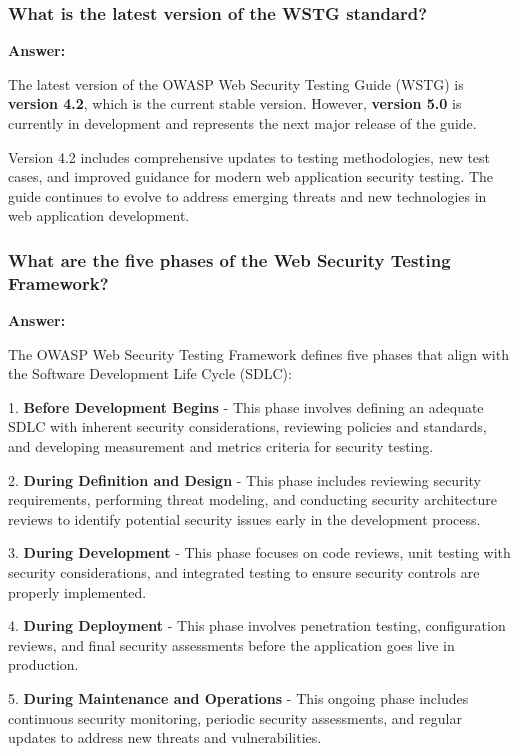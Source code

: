 \documentclass[12pt,a4paper]{article}
\begin{document}
\subsubsection{What is the latest version of the WSTG standard?}

\textbf{Answer:}

The latest version of the OWASP Web Security Testing Guide (WSTG) is \textbf{version 4.2}, which is the current stable version. However, \textbf{version 5.0} is currently in development and represents the next major release of the guide.

Version 4.2 includes comprehensive updates to testing methodologies, new test cases, and improved guidance for modern web application security testing. The guide continues to evolve to address emerging threats and new technologies in web application development.

\subsubsection{What are the five phases of the Web Security Testing Framework?}

\textbf{Answer:}

The OWASP Web Security Testing Framework defines five phases that align with the Software Development Life Cycle (SDLC):

1. \textbf{Before Development Begins} - This phase involves defining an adequate SDLC with inherent security considerations, reviewing policies and standards, and developing measurement and metrics criteria for security testing.

2. \textbf{During Definition and Design} - This phase includes reviewing security requirements, performing threat modeling, and conducting security architecture reviews to identify potential security issues early in the development process.

3. \textbf{During Development} - This phase focuses on code reviews, unit testing with security considerations, and integrated testing to ensure security controls are properly implemented.

4. \textbf{During Deployment} - This phase involves penetration testing, configuration reviews, and final security assessments before the application goes live in production.

5. \textbf{During Maintenance and Operations} - This ongoing phase includes continuous security monitoring, periodic security assessments, and regular updates to address new threats and vulnerabilities.
\end{document}
